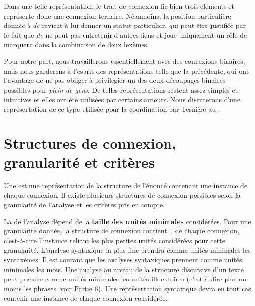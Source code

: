 {    %

    Dans une telle représentation, le trait de connexion lie bien trois éléments et représente donc une connexion ternaire. Néanmoins, la position particulière donnée à \textit{de} revient à lui donner un statut particulier, qui peut être justifiée par le fait que \textit{de} ne peut pas entretenir d’autres liens et joue uniquement un rôle de marqueur dans la combinaison de deux lexèmes.

    Pour notre part, nous travaillerons essentiellement avec des connexions binaires, mais nous garderons à l’esprit des représentations telle que la précédente, qui ont l’avantage de ne pas obliger à privilégier un des deux découpages binaires possibles pour \textit{plein de gens}. De telles représentations restent assez simples et intuitives et elles ont été utilisées par certains auteurs. Nous discuterons d’une représentation de ce type utilisée pour la coordination par Tesnière au .
}
\section{Structures de connexion, granularité et critères}\label{sec:3.2.18}

Une  est une représentation de la structure de l’énoncé contenant une instance de chaque connexion. Il existe plusieurs structures de connexion possibles selon la granularité de l’analyse et les critères pris en compte.

La  de l’analyse dépend de la \textbf{taille des unités minimales} considérées. Pour une granularité donnée, la structure de connexion contient l’ de chaque connexion, c’est-à-dire l’instance reliant les plus petites unités considérées pour cette granularité. L’analyse syntaxique la plus fine prendra comme unités minimales les syntaxèmes. Il est courant que les analyses syntaxiques prennent comme unités minimales les mots. Une analyse au niveau de la structure discursive d’un texte peut prendre comme unités minimales les unités illocutoires (c’est-à-dire plus ou moins les phrases, voir Partie 6). Une représentation syntaxique devra en tout cas contenir une instance de chaque connexion considérée.

